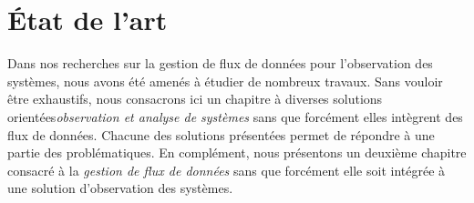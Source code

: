 \part{État de l'art}
Dans nos recherches sur la gestion de flux de données pour l'observation des systèmes, nous avons été amenés à étudier de nombreux travaux. Sans vouloir être exhaustifs, nous consacrons ici un chapitre à diverses solutions orientées\textit{observation et analyse de systèmes} sans que forcément elles intègrent des flux de données. Chacune des solutions présentées permet de répondre à une partie des problématiques. En complément, nous présentons un deuxième chapitre consacré à la \textit{gestion de flux de données} sans que forcément elle soit intégrée à une solution d'observation des systèmes.



